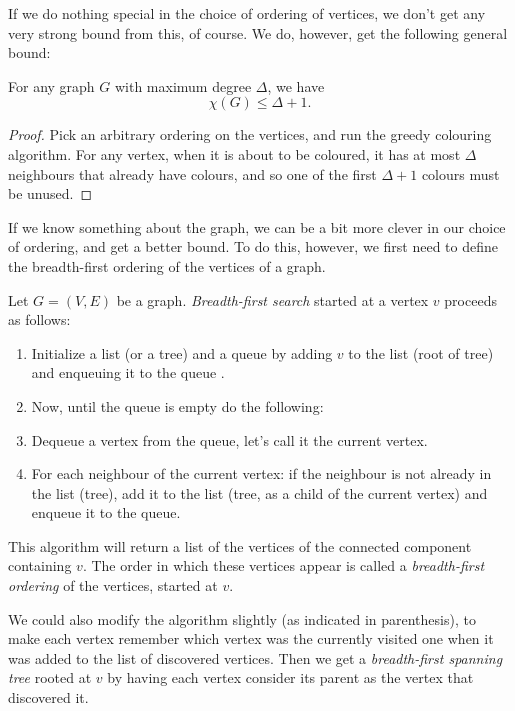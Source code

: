\documentclass[nobib]{tufte-handout}
\begin{document}
If we do nothing special in the choice of ordering of vertices, we don't get any very strong bound from this, of course. We do, however, get the following general bound:

\begin{lemma}\label{lemma:trivial_chi_upper_bound}
  For any graph $G$ with maximum degree $\Delta$, we have
  $$\chi(G) \leq \Delta + 1.$$

  \begin{proof}
    Pick an arbitrary ordering on the vertices, and run the greedy colouring algorithm. For any vertex, when it is about to be coloured, it has at most $\Delta$ neighbours that already have colours, and so one of the first $\Delta + 1$ colours must be unused.
  \end{proof}
\end{lemma}

If we know something about the graph, we can be a bit more clever in our choice of ordering, and get a better bound. To do this, however, we first need to define the breadth-first ordering of the vertices of a graph.

\begin{definition}
  Let $G = (V,E)$ be a graph. \emph{Breadth-first search} started at a vertex $v$ proceeds as follows:
  \begin{enumerate}
    \item Initialize a list (or a tree) and a queue by adding \(v\) to the list (root of tree) and enqueuing it to the queue .
    \item Now, until the queue is empty do the following:
    \item Dequeue a vertex from the queue, let's call it the current vertex.
    \item For each neighbour of the current vertex: if the neighbour is not already in the list (tree), add it to the list (tree, as a child of the current vertex) and enqueue it to the queue.
  \end{enumerate}

  This algorithm will return a list of the vertices of the connected component containing $v$. The order in which these vertices appear is called a \emph{breadth-first ordering} of the vertices, started at $v$. 
  
  We could also modify the algorithm slightly (as indicated in parenthesis), to make each vertex remember which vertex was the currently visited one when it was added to the list of discovered vertices. Then we get a \emph{breadth-first spanning tree} rooted at $v$ by having each vertex consider its parent as the vertex that discovered it.
\end{definition}
\end{document}
